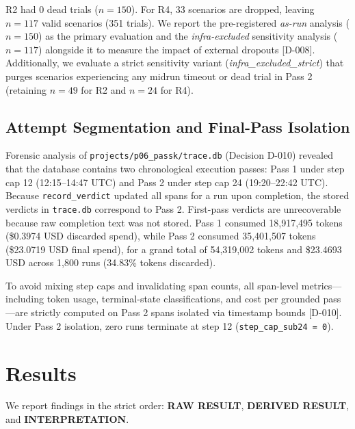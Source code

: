 \documentclass[11pt,letterpaper]{article}
\begin{document}
R2 had 0 dead trials ($n=150$). For R4, 33 scenarios are dropped, leaving $n=117$ valid scenarios (351 trials). We report the pre-registered \emph{as-run} analysis ($n=150$) as the primary evaluation and the \emph{infra-excluded} sensitivity analysis ($n=117$) alongside it to measure the impact of external dropouts [D-008]. Additionally, we evaluate a strict sensitivity variant (\emph{infra\_excluded\_strict}) that purges scenarios experiencing any midrun timeout or dead trial in Pass 2 (retaining $n=49$ for R2 and $n=24$ for R4).

\subsection{Attempt Segmentation and Final-Pass Isolation}
Forensic analysis of \texttt{projects/p06\_passk/trace.db} (Decision D-010) revealed that the database contains two chronological execution passes: Pass 1 under step cap 12 (12:15–14:47 UTC) and Pass 2 under step cap 24 (19:20–22:42 UTC). Because \texttt{record\_verdict} updated all spans for a run upon completion, the stored verdicts in \texttt{trace.db} correspond to Pass 2. First-pass verdicts are unrecoverable because raw completion text was not stored. Pass 1 consumed 18,917,495 tokens (\$0.3974 USD discarded spend), while Pass 2 consumed 35,401,507 tokens (\$23.0719 USD final spend), for a grand total of 54,319,002 tokens and \$23.4693 USD across 1,800 runs (34.83\% tokens discarded).

To avoid mixing step caps and invalidating span counts, all span-level metrics—including token usage, terminal-state classifications, and cost per grounded pass—are strictly computed on Pass 2 spans isolated via timestamp bounds [D-010]. Under Pass 2 isolation, zero runs terminate at step 12 (\texttt{step\_cap\_sub24 = 0}).

\section{Results}

We report findings in the strict order: \textbf{RAW RESULT}, \textbf{DERIVED RESULT}, and \textbf{INTERPRETATION}.
\end{document}
